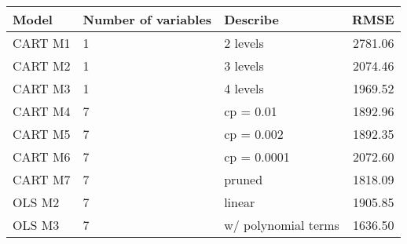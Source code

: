 \begin{tabular}{lllr}
  \toprule
Model & Number of variables & Describe & RMSE \\ 
  \midrule
CART M1 & 1 & 2 levels & 2781.06 \\ 
  CART M2 & 1 &  3 levels & 2074.46 \\ 
  CART M3 & 1 & 4 levels & 1969.52 \\ 
  CART M4 & 7 & cp = 0.01 & 1892.96 \\ 
  CART M5 & 7 & cp = 0.002 & 1892.35 \\ 
  CART M6 & 7 &  cp = 0.0001 & 2072.60 \\ 
  CART M7 & 7 &  pruned & 1818.09 \\ 
  OLS  M2 & 7 &  linear & 1905.85 \\ 
  OLS M3 &  7 &  w/ polynomial terms & 1636.50 \\ 
   \bottomrule
\end{tabular}
